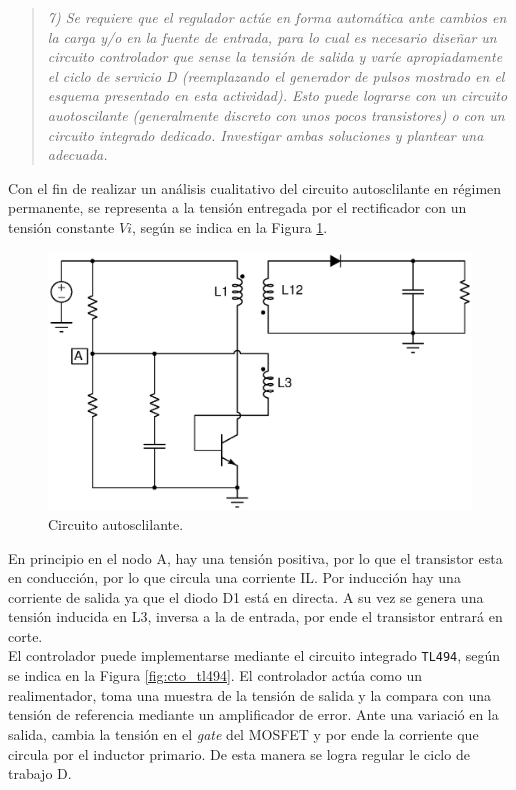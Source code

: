 \begin{quote} \textit{7) Se requiere que el regulador actúe en forma automática ante cambios en la carga y/o en la fuente de entrada, para lo cual es necesario diseñar un circuito controlador que sense la tensión de salida y varíe apropiadamente el ciclo de servicio D (reemplazando el generador de pulsos mostrado en el esquema presentado en esta actividad). Esto puede lograrse con un circuito auotoscilante (generalmente discreto con unos pocos transistores) o con un circuito integrado dedicado. Investigar ambas soluciones y plantear una adecuada.}
\end{quote}


Con el fin de realizar un análisis cualitativo del circuito autosclilante en régimen permanente, se representa a la tensión entregada por el rectificador con un tensión constante $Vi$, según se indica en la Figura \ref{fig:cto_auto}. 


\begin{figure}[H]
	\centering
	\includegraphics[scale=0.4]{Figuras/auto.eps}
	\caption{Circuito autosclilante.}
	\label{fig:cto_auto}
\end{figure}


En principio en el nodo A, hay una tensión positiva, por lo que el transistor esta en conducción, por lo que circula una corriente IL. Por inducción hay una corriente de salida ya que el diodo D1 está en directa. A su vez se genera una tensión inducida en L3, inversa a la de entrada, por ende el transistor entrará en corte. \\


El controlador puede implementarse mediante el circuito integrado \texttt{TL494}, según se indica en la Figura \ref{fig:cto_tl494}. El controlador actúa como un realimentador, toma una muestra de la tensión de salida y la compara con una tensión de referencia mediante un amplificador de error. Ante una variació en la salida, cambia la tensión en el \textit{gate} del MOSFET y por ende la corriente que circula por el inductor primario. De esta manera se logra regular le ciclo de trabajo D.


